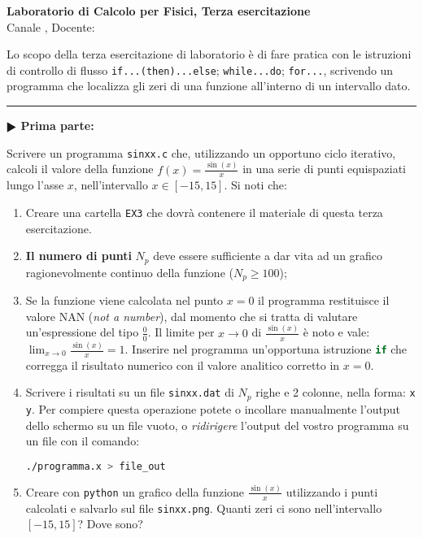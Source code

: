 \documentclass[11pt]{article}
\begin{document}
\pagestyle{empty}

\begin{center}
{\Large \bf  Laboratorio di Calcolo per Fisici, Terza esercitazione\\[2mm]}
{\large Canale \canale, Docente: \docente}
\end{center}
\vspace{4mm}

\begin{mdframed}[backgroundcolor=panna]
  Lo scopo della terza esercitazione di laboratorio \`e di fare pratica con
  le istruzioni di controllo di flusso \texttt{if...(then)...else}; \texttt{while...do};
\texttt{for...}, scrivendo un programma che localizza gli zeri di una funzione
all'interno di un intervallo dato.
  \end{mdframed}
%
%

\hrule
\vspace{2mm}
\textbf{$\RHD$ Prima parte:}

Scrivere un programma \texttt{sinxx.c} che, utilizzando un opportuno ciclo iterativo,
calcoli il valore della funzione $f(x)=\frac{\sin(x)}{x}$ in una serie di
punti equispaziati lungo l'asse $x$, nell'intervallo $x \in \left[-15,15 \right]$.
Si noti che:
\begin{enumerate}
\item Creare una cartella  \texttt{EX3} che dovrà contenere il materiale di questa terza esercitazione.
\item  {\bf Il numero di punti} $N_{p}$ deve essere sufficiente a dar vita ad un grafico ragionevolmente continuo della funzione ($N_p \ge 100$);
\item Se la funzione viene calcolata nel punto $x=0$ il programma restituisce il valore NAN (\emph{not a number}), 
dal momento che si tratta di valutare un'espressione del tipo $\frac{0}{0}$. Il limite per $x \to 0$ di 
$\frac{\sin(x)}{x}$ \`e noto e vale: $\lim_{x \to 0} \frac{\sin(x)}{x} = 1$.
Inserire nel programma un'opportuna  istruzione \lstinline[language=c]!if! che corregga il risultato numerico con il valore analitico corretto in $x=0$.
\item Scrivere i risultati su un file \texttt{sinxx.dat} di $N_p$ righe e 2 colonne, nella forma: \texttt{x y}. Per compiere questa operazione potete o incollare manualmente l'output dello schermo su un file vuoto, o {\em ridirigere\/} l'output
del vostro programma su un file con il comando:
\\
\begin{lstlisting}[numbers=none,language=bash]
./programma.x > file_out
\end{lstlisting}
\item Creare con \texttt{python} un grafico della funzione $\frac{\sin(x)}{x}$
utilizzando i punti calcolati e salvarlo sul file \texttt{sinxx.png}. 
 Quanti zeri ci sono nell'intervallo $\left[ -15,15 \right]$? Dove sono?
\end{enumerate}
\end{document}
